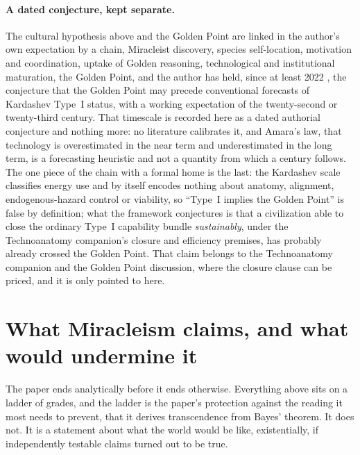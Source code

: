 \paragraph{A dated conjecture, kept separate.} The cultural hypothesis above and the Golden Point are linked in the author's own expectation by a chain, Miracleist discovery, species self-location, motivation and coordination, uptake of Golden reasoning, technological and institutional maturation, the Golden Point, and the author has held, since at least 2022 \cite{GoldenScience2022}, the conjecture that the Golden Point may precede conventional forecasts of Kardashev Type~I status, with a working expectation of the twenty-second or twenty-third century. That timescale is recorded here as a dated authorial conjecture and nothing more: no literature calibrates it, and Amara's law, that technology is overestimated in the near term and underestimated in the long term, is a forecasting heuristic and not a quantity from which a century follows. The one piece of the chain with a formal home is the last: the Kardashev scale classifies energy use and by itself encodes nothing about anatomy, alignment, endogenous-hazard control or viability, so ``Type~I implies the Golden Point'' is false by definition; what the framework conjectures is that a civilization able to close the ordinary Type~I capability bundle \emph{sustainably}, under the Technoanatomy companion's closure and efficiency premises, has probably already crossed the Golden Point. That claim belongs to the Technoanatomy companion and the Golden Point discussion, where the closure clause can be priced, and it is only pointed to here.

\section{What Miracleism claims, and what would undermine it}\label{sec:ladder}

The paper ends analytically before it ends otherwise. Everything above
sits on a ladder of grades, and the ladder is the paper's protection
against the reading it most needs to prevent, that it derives
transcendence from Bayes' theorem. It does not. It is a statement about
what the world would be like, existentially, if independently testable
claims turned out to be true.

